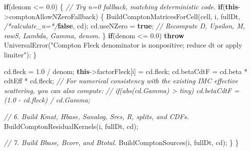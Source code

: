 \documentclass[
]{article}
\newenvironment{Shaded}{}{}
\newcommand{\CommentTok}[1]{\textcolor[rgb]{0.38,0.63,0.69}{\textit{#1}}}
\newcommand{\ControlFlowTok}[1]{\textcolor[rgb]{0.00,0.44,0.13}{\textbf{#1}}}
\newcommand{\FloatTok}[1]{\textcolor[rgb]{0.25,0.63,0.44}{#1}}
\newcommand{\KeywordTok}[1]{\textcolor[rgb]{0.00,0.44,0.13}{\textbf{#1}}}
\newcommand{\NormalTok}[1]{#1}
\newcommand{\OperatorTok}[1]{\textcolor[rgb]{0.40,0.40,0.40}{#1}}
\newcommand{\StringTok}[1]{\textcolor[rgb]{0.25,0.44,0.63}{#1}}
\begin{document}
\begin{Shaded}
\begin{Highlighting}[]
        \ControlFlowTok{if}\OperatorTok{(}\NormalTok{denom }\OperatorTok{\textless{}=} \FloatTok{0.0}\OperatorTok{)}
        \OperatorTok{\{}
            \CommentTok{// Try n=0 fallback, matching deterministic code.}
            \ControlFlowTok{if}\OperatorTok{(}\KeywordTok{this}\OperatorTok{{-}\textgreater{}}\NormalTok{comptonAllowNZeroFallback}\OperatorTok{)}
            \OperatorTok{\{}
\NormalTok{                BuildComptonMatricesForCell}\OperatorTok{(}\NormalTok{cell}\OperatorTok{,}\NormalTok{ i}\OperatorTok{,}\NormalTok{ fullDt}\OperatorTok{,} \CommentTok{/*calculate\_n=*/}\KeywordTok{false}\OperatorTok{,}\NormalTok{ cd}\OperatorTok{);}
\NormalTok{                cd}\OperatorTok{.}\NormalTok{useNZero }\OperatorTok{=} \KeywordTok{true}\OperatorTok{;}
                \CommentTok{// Recompute D, Upsilon, M, rowS, Lambda, Gamma, denom.}
            \OperatorTok{\}}
            \ControlFlowTok{if}\OperatorTok{(}\NormalTok{denom }\OperatorTok{\textless{}=} \FloatTok{0.0}\OperatorTok{)}
                \ControlFlowTok{throw}\NormalTok{ UniversalError}\OperatorTok{(}\StringTok{"Compton Fleck denominator is nonpositive; reduce dt or apply limiter"}\OperatorTok{);}
        \OperatorTok{\}}

\NormalTok{        cd}\OperatorTok{.}\NormalTok{fleck }\OperatorTok{=} \FloatTok{1.0} \OperatorTok{/}\NormalTok{ denom}\OperatorTok{;}
        \KeywordTok{this}\OperatorTok{{-}\textgreater{}}\NormalTok{factorFleck}\OperatorTok{[}\NormalTok{i}\OperatorTok{]} \OperatorTok{=}\NormalTok{ cd}\OperatorTok{.}\NormalTok{fleck}\OperatorTok{;}
\NormalTok{        cd}\OperatorTok{.}\NormalTok{betaCdtF }\OperatorTok{=}\NormalTok{ cd}\OperatorTok{.}\NormalTok{beta }\OperatorTok{*}\NormalTok{ cdtEff }\OperatorTok{*}\NormalTok{ cd}\OperatorTok{.}\NormalTok{fleck}\OperatorTok{;}
        \CommentTok{// For numerical consistency with the existing IMC effective scattering, you can also compute:}
        \CommentTok{// if(abs(cd.Gamma) \textgreater{} tiny) cd.betaCdtF = (1.0 {-} cd.fleck) / cd.Gamma;}

        \CommentTok{// 6. Build Kmat, Hbase, Sanalog, Sres, R, splits, and CDFs.}
\NormalTok{        BuildComptonResidualKernels}\OperatorTok{(}\NormalTok{i}\OperatorTok{,}\NormalTok{ fullDt}\OperatorTok{,}\NormalTok{ cd}\OperatorTok{);}

        \CommentTok{// 7. Build Bbase, Bcorr, and Btotal.}
\NormalTok{        BuildComptonSources}\OperatorTok{(}\NormalTok{i}\OperatorTok{,}\NormalTok{ fullDt}\OperatorTok{,}\NormalTok{ cd}\OperatorTok{);}
    \OperatorTok{\}}
\OperatorTok{\}}
\end{Highlighting}
\end{Shaded}
\end{document}
